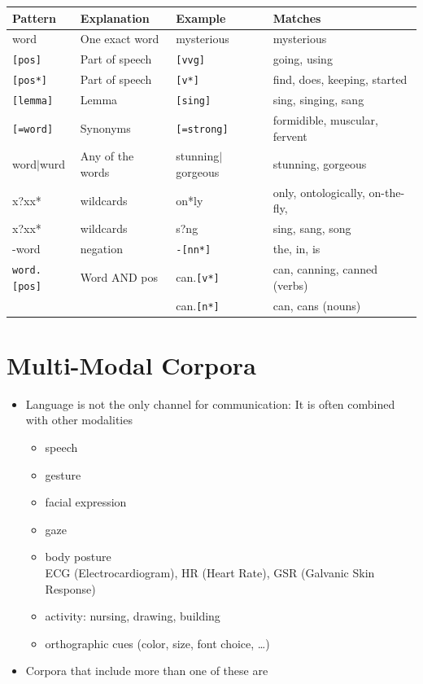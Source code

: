 \documentclass[a4paper,landscape,headrule,footrule,dvips]{foils}
\begin{document}
\begin{CJK}{UTF8}{min}
\begin{small}
  \begin{tabular}{llll}
    Pattern & Explanation & Example & Matches \\ \hline
    word & One exact word & mysterious  & mysterious \\
    \texttt{[pos]} & Part of speech & \texttt{[vvg]} & going, using \\
    \texttt{[pos*]} & Part of speech & \texttt{[v*]} & find, does, keeping, started  \\
    \texttt{[lemma]} & Lemma & \texttt{[sing]} & sing, singing, sang \\
    \texttt{[=word]} & Synonyms & \texttt{[=strong]} & 	formidible, muscular, fervent \\
    word$|$wurd & Any of the words & stunning$|$gorgeous & stunning, gorgeous \\
    x?xx* & wildcards & on*ly & only, ontologically, on-the-fly, \\
    x?xx* & wildcards & s?ng & sing, sang, song \\
    -word & negation & \texttt{-[nn*]} & the, in, is \\
    \texttt{word.[pos]} & Word AND pos& can.\texttt{[v*]} &can, canning, canned (verbs)\\ 
& & can.\texttt{[n*]} & can, cans (nouns)\\
  \end{tabular}
\end{small}


\section{Multi-Modal Corpora}


\begin{itemize}
\item Language is not the only channel for communication: It is often
  combined with other modalities
  \begin{itemize}
  \item speech
  \item gesture
  \item facial expression
  \item gaze
  \item body posture
\\ ECG (Electrocardiogram), HR (Heart Rate), GSR (Galvanic Skin Response)
  \item activity: nursing, drawing, building
  \item orthographic cues (color, size, font choice, \ldots)
  \end{itemize}
\item Corpora that include more than one of these are 
\end{itemize}


\end{CJK}
\end{document}
